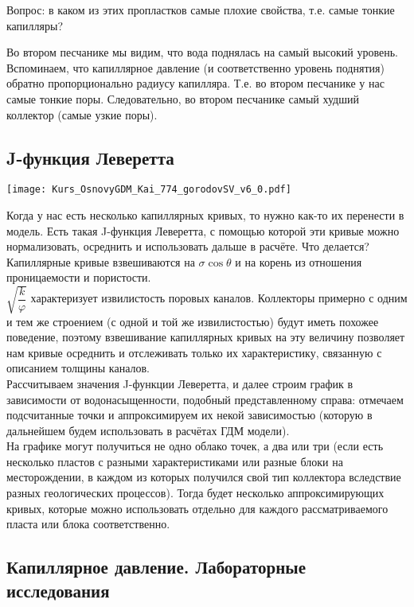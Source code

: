 \documentclass[main.tex]{subfiles}
\begin{document}
Вопрос: в каком из этих пропластков самые плохие свойства, т.е. самые тонкие капилляры?

Во втором песчанике мы видим, что вода поднялась на самый высокий уровень. Вспоминаем, что капиллярное давление (и соответственно уровень поднятия) обратно пропорционально радиусу капилляра. Т.е. во втором песчанике у нас самые тонкие поры.
Следовательно, во втором песчанике самый худший коллектор (самые узкие поры).

\subsection{J-функция Леверетта}

\texttt{[image: Kurs\_OsnovyGDM\_Kai\_774\_gorodovSV\_v6\_0.pdf]}

Когда у нас есть несколько капиллярных кривых, то нужно как-то их перенести в модель.
Есть такая J-функция Леверетта, с помощью которой эти кривые можно нормализовать, осреднить и использовать дальше в расчёте.
Что делается? Капиллярные кривые взвешиваются на $\sigma \cos\theta$ и на корень из отношения проницаемости и пористости.
\\

$\sqrt{\dfrac{k}{\varphi}}$ характеризует извилистость поровых каналов.
Коллекторы примерно с одним и тем же строением (с одной и той же извилистостью) будут иметь похожее поведение, поэтому взвешивание капиллярных кривых на эту величину позволяет нам кривые осреднить и отслеживать только их характеристику, связанную с описанием толщины каналов.
\\

Рассчитываем значения J-функции Леверетта, и далее строим график в зависимости от водонасыщенности, подобный представленному справа: отмечаем подсчитанные точки и аппроксимируем их некой зависимостью (которую в дальнейшем будем использовать в расчётах ГДМ модели).
\\

На графике могут получиться не одно облако точек, а два или три (если есть несколько пластов с разными характеристиками или разные блоки на месторождении, в каждом из которых получился свой тип коллектора вследствие разных геологических процессов).
Тогда будет несколько аппроксимирующих кривых, которые можно использовать отдельно для каждого рассматриваемого пласта или блока соответственно.

\subsection{Капиллярное давление. Лабораторные исследования}
\end{document}
